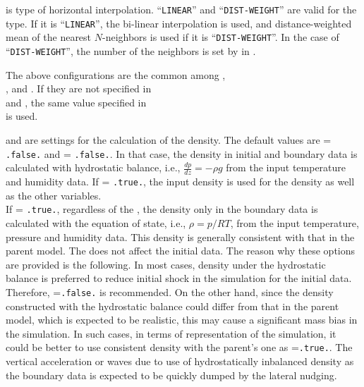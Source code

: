  is type of horizontal interpolation.
``\verb|LINEAR|'' and ``\verb|DIST-WEIGHT|'' are valid for the type.
If it is ``\verb|LINEAR|'', the bi-linear interpolation is used, and distance-weighted mean of the nearest $N$-neighbors is used if it is ``\verb|DIST-WEIGHT|''.
In the case of ``\verb|DIST-WEIGHT|'', the number of the neighbors is set by  in .

The above configurations are the common among ,\\ , and .
If they are not specified in\\  and , the same value specified in\\  is used.


 and  are settings for the calculation of the density.
The default values are  = \verb|.false.| and  = \verb|.false.|.
In that case, the density in initial and boundary data is calculated with hydrostatic balance, i.e., $\frac{dp}{dz}=-\rho g$ from the input temperature and humidity data.
If  = \verb|.true.|, the input density is used for the density as well as the other variables.\\
If  = \verb|.true.|, regardless of the , the density only in the boundary data is calculated with the equation of state, i.e., $\rho = p/RT$,  from the input temperature, pressure and humidity data.
This density is generally consistent with that in the parent model.
The  does not affect the initial data.
The reason why these options are provided is the following.
In most cases, density under the hydrostatic balance is preferred to reduce initial shock in the simulation for the initial data.
Therefore, =\verb|.false.| is recommended.
On the other hand, since the density constructed with the hydrostatic balance could differ from that in the parent model, which is expected to be realistic, this may cause a significant mass bias in the simulation.
In such cases, in terms of representation of the simulation, it could be better to use consistent density with the parent's one as =\verb|.true.|.
The vertical acceleration or waves due to use of hydrostatically inbalanced density as the boundary data is expected to be quickly dumped by the lateral nudging.


